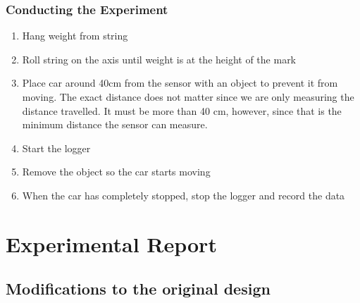 \documentclass[titlepage,12pt]{article}
\let\oldsection\section
\renewcommand\section{\FloatBarrier\oldsection}
\let\oldsubsection\subsection
\renewcommand\subsection{\FloatBarrier \oldsubsection}
\begin{document}
\subsubsection{Conducting the Experiment}

\begin{enumerate}
    \item Hang weight from string
    \item Roll string on the axis until weight is at the height of the mark
    \item Place car around 40cm from the sensor with an object to prevent it from moving.
        The exact distance does not matter since we are only measuring the distance
        travelled. It must be more than 40 cm, however, since that is the minimum distance
        the sensor can measure.  
    \item Start the logger
    \item Remove the object so the car starts moving
    \item When the car has completely stopped, stop the logger and record the data
\end{enumerate}

\section{Experimental Report}

\subsection{Modifications to the original design}
\end{document}
